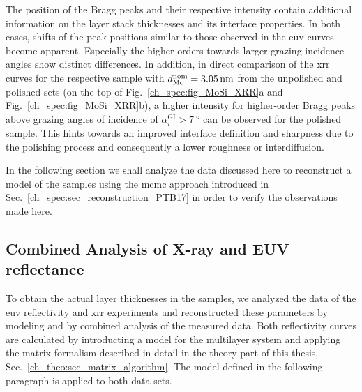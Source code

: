 The position of the Bragg peaks and their respective intensity contain additional information on the layer stack thicknesses and its interface properties. In both cases, shifts of the peak positions similar to those observed in the \gls{euv} curves become apparent. Especially the higher orders towards larger grazing incidence angles show distinct differences. In addition, in direct comparison of the \gls{xrr} curves for the respective sample with $d_\text{Mo}^\text{nom} = \nm{3.05}$ from the unpolished and polished sets (on the top of Fig.~\ref{ch_spec:fig_MoSi_XRR}a and Fig.~\ref{ch_spec:fig_MoSi_XRR}b), a higher intensity for higher-order Bragg peaks above grazing angles of incidence of $\alpha_i^\text{GI} > \SI{7}{\degree}$ can be observed for the polished sample. This hints towards an improved interface definition and sharpness due to the polishing process and consequently a lower roughness or interdiffusion.

In the following section we shall analyze the data discussed here to reconstruct a model of the samples using the \gls{mcmc} approach introduced in Sec.~\ref{ch_spec:sec_reconstruction_PTB17} in order to verify the observations made here.

\subsection{Combined Analysis of X-ray and EUV reflectance}
To obtain the actual layer thicknesses in the samples, we analyzed the data of the \gls{euv} reflectivity and \gls{xrr} experiments and reconstructed these parameters by modeling and by combined analysis of the measured data. Both reflectivity curves are calculated by introducting a model for the multilayer system and applying the matrix formalism described in detail in the theory part of this thesis, Sec.~\ref{ch_theo:sec_matrix_algorithm}. The model defined in the following paragraph is applied to both data sets.

